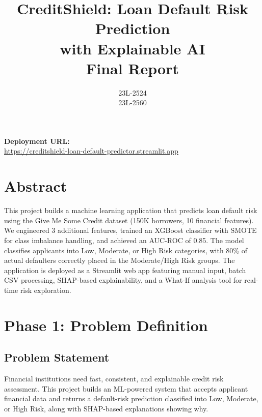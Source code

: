 \documentclass[12pt, a4paper]{article}
\title{\textbf{CreditShield: Loan Default Risk Prediction\\with Explainable AI} \\ \vspace{0.5em} \large Final Report}
\author{23L-2524 \\ 23L-2560}
\date{\vspace{-2em}}
\begin{document}
\maketitle

\begin{center}
\large\textbf{Deployment URL:} \\
\vspace{0.3em}
\url{https://creditshield-loan-default-predictor.streamlit.app}
\end{center}

\vspace{1em}

\section*{Abstract}

This project builds a machine learning application that predicts loan default risk using the Give Me Some Credit dataset (150K borrowers, 10 financial features). We engineered 3 additional features, trained an XGBoost classifier with SMOTE for class imbalance handling, and achieved an AUC-ROC of 0.85. The model classifies applicants into Low, Moderate, or High Risk categories, with 80\% of actual defaulters correctly placed in the Moderate/High Risk groups. The application is deployed as a Streamlit web app featuring manual input, batch CSV processing, SHAP-based explainability, and a What-If analysis tool for real-time risk exploration.

\tableofcontents
\newpage


\section{Phase 1: Problem Definition}

\subsection{Problem Statement}

Financial institutions need fast, consistent, and explainable credit risk assessment. This project builds an ML-powered system that accepts applicant financial data and returns a default-risk prediction classified into Low, Moderate, or High Risk, along with SHAP-based explanations showing why.
\end{document}
